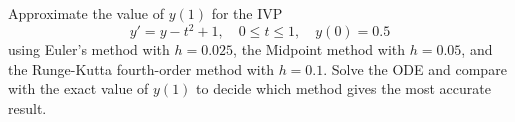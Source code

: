\documentclass[worksheet]{workbook}
\begin{document}
	
	\maketitle
    
\begin{question}
    Approximate the value of $y(1)$ for the IVP 
    \[y'=y-t^2+1, \quad 0\leq t\leq 1, \quad y(0)=0.5\]
    using  Euler’s method with $h = 0.025$, the Midpoint method with $h = 0.05$, and the Runge-Kutta fourth-order method with $h = 0.1$.  Solve the ODE and compare with the exact value of $y(1)$ to decide which method gives the most accurate result.
\end{question}
	
\end{document}
